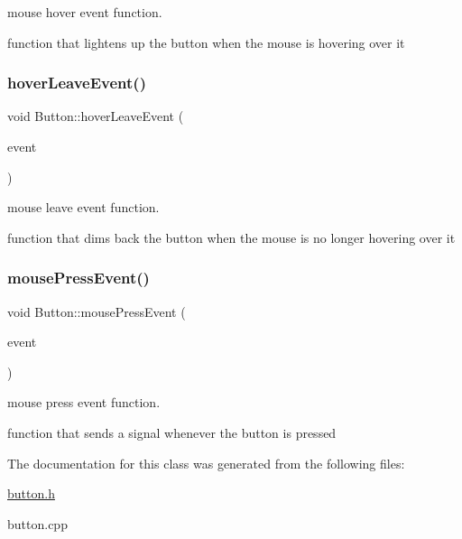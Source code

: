 mouse hover event function. 

function that lightens up the button when the mouse is hovering over it \mbox{\label{classButton_a1689a97690d9469ce8350d24db0d7485}} 
\subsubsection{\texorpdfstring{hover\+Leave\+Event()}{hoverLeaveEvent()}}
{\footnotesize\ttfamily void Button\+::hover\+Leave\+Event (\begin{DoxyParamCaption}\item[{Q\+Graphics\+Scene\+Hover\+Event $\ast$}]{event }\end{DoxyParamCaption})}



mouse leave event function. 

function that dims back the button when the mouse is no longer hovering over it \mbox{\label{classButton_a17d8eb0c904605b223bbc00c75655315}} 
\subsubsection{\texorpdfstring{mouse\+Press\+Event()}{mousePressEvent()}}
{\footnotesize\ttfamily void Button\+::mouse\+Press\+Event (\begin{DoxyParamCaption}\item[{Q\+Graphics\+Scene\+Mouse\+Event $\ast$}]{event }\end{DoxyParamCaption})}



mouse press event function. 

function that sends a signal whenever the button is pressed 

The documentation for this class was generated from the following files\+:\begin{DoxyCompactItemize}
\item 
\hyperlink{button_8h}{button.\+h}\item 
button.\+cpp\end{DoxyCompactItemize}
